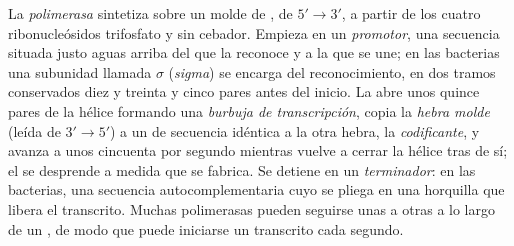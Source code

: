 \begin{definition}\label{def:b1:gene-expression:transcription}
La \emph{ polimerasa} sintetiza  sobre un molde de , de
$5' \to 3'$, a partir de los cuatro ribonucleósidos trifosfato y sin
cebador. Empieza en un \emph{promotor}, una secuencia situada justo aguas
arriba del  que la  reconoce y a la que se une; en las bacterias
una subunidad llamada $\sigma$ (\emph{sigma}) se encarga del
reconocimiento, en dos tramos conservados diez y treinta y cinco pares antes
del inicio. La  abre unos quince pares de la hélice formando una
\emph{burbuja de transcripción}, copia la \emph{hebra molde} (leída de
$3' \to 5'$) a un  de secuencia idéntica a la otra hebra, la
\emph{codificante}, y avanza a unos cincuenta  por segundo
mientras vuelve a cerrar la hélice tras de sí; el  se desprende a medida
que se fabrica. Se detiene en un \emph{terminador}: en las bacterias, una
secuencia autocomplementaria cuyo  se pliega en una horquilla que libera
el transcrito. Muchas polimerasas pueden seguirse unas a otras a lo largo de
un , de modo que puede iniciarse un transcrito cada segundo.
\end{definition}

